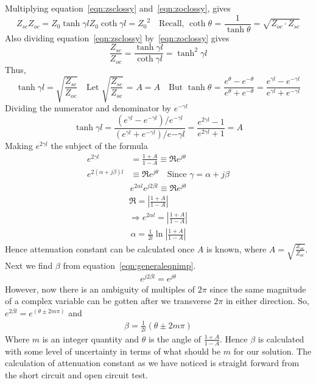 Multiplying equation~\eqref{eqn:zsclossy} and~\eqref{eqn:zoclossy}, gives
\begin{dmath*}
Z_{sc}Z_{oc}
= Z_0\tanh\gamma l Z_0\coth\gamma l
= {Z_0}^2\quad\text{Recall, }\coth\theta\text{ = }\frac{1}{\tanh\theta}
= \sqrt{Z_{oc}\cdot Z_{sc}}
\end{dmath*}
Also dividing equation~\eqref{eqn:zsclossy} by~\eqref{eqn:zoclossy} gives
\begin{dmath*}
\frac{Z_{sc}}{Z_{oc}} = \frac{\tanh\gamma l}{\coth\gamma l} 
= \tanh^2\gamma l
\end{dmath*}
Thus,
\begin{dmath*}
\tanh\gamma l = \sqrt{\frac{Z_{sc}}{Z_{oc}}}\quad\text{Let }\sqrt{\frac{Z_{sc}}{Z_{oc}}}\text{ = }A
= A\quad\text{But }\tanh \theta\text{ = }\frac{e^\theta - e^{-\theta}}{e^\theta + e^{-\theta}}
=\frac{e^{\gamma l} - e^{-\gamma l}}{e^{\gamma l} + e^{-\gamma l}}
\end{dmath*}
Dividing the numerator and denominator by $e^{-\gamma l}$
\begin{dmath*}
\tanh\gamma l = \frac{(e^{\gamma l} - e^{-\gamma l})/e^{-\gamma l}}{(e^{\gamma l} + e^{-\gamma l})/e{-\gamma l}}
= \frac{e^{2\gamma l} - 1}{e^{2\gamma l} + 1} = A
\end{dmath*}
Making $e^{2\gamma l}$ the subject of the formula
\begin{align*}
e^{2\gamma l} &= \frac{1 +A}{1 - A}\equiv \Re e^{j\theta}\\
e^{2(\alpha + j\beta)l} &\equiv \Re e^{j\theta}\quad\text{Since }\gamma = \alpha + j\beta
\end{align*}
\begin{align}
e^{2\alpha l}e^{j2\beta l} \equiv \Re e^{j\theta}
\label{eqn:generaleqnimp}
\end{align}
\begin{align*}
\Re = \left|\frac{1 + A}{1 - A}\right|\\ \Rightarrow e^{2\alpha l} = \left|\frac{1 + A}{1 - A}\right|
\end{align*}
\begin{align}
\alpha = \frac{1}{2l}\ln\left|\frac{1 + A}{1 - A}\right|
\end{align}
Hence attenuation constant can be calculated once $A$ is known, where $A = \sqrt{\frac{Z_{sc}}{Z_{oc}}}$. Next we find $\beta$ from equation~\eqref{eqn:generaleqnimp}.
\begin{align*}
e^{j2\beta l} = e^{j\theta}
\end{align*}
However, now there is an ambiguity of multiples of $2\pi$ since the same magnitude of a complex variable can be gotten after we transverse $2\pi$ in either direction. So, $e^{2\beta l} = e^{(\theta \pm 2m\pi)}$ and
\begin{align}
\beta = \frac{1}{2l} (\theta \pm 2m\pi)
\end{align}
Where $m$ is an integer quantity and $\theta$ is the angle of $\frac{1 + A}{1 - A}$. Hence $\beta$ is calculated with some level of uncertainty in terms of what should be $m$ for our solution. The calculation of attenuation constant as we have noticed is straight forward from the short circuit and open circuit test.

